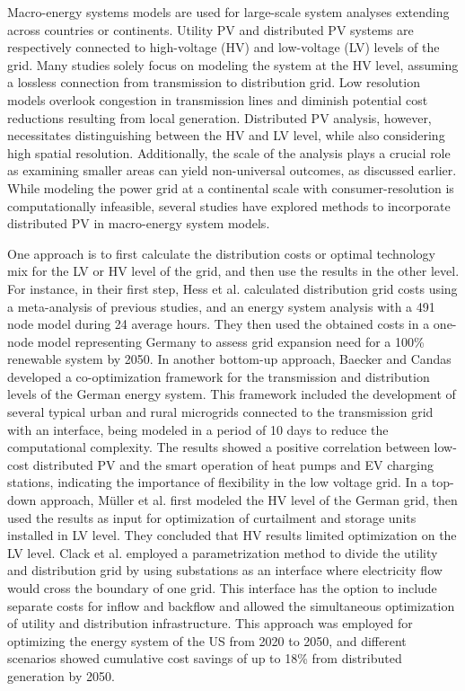 \documentclass[review]{elsarticle}
\begin{document}
	Macro-energy systems models are used for large-scale system analyses extending across countries or continents. Utility PV and distributed PV systems are respectively connected to high-voltage (HV) and low-voltage (LV) levels of the grid. Many studies solely focus on modeling the system at the HV level, assuming a lossless connection from transmission to distribution grid. Low resolution models overlook congestion in transmission lines and diminish potential cost reductions resulting from local generation. Distributed PV analysis, however, necessitates distinguishing between the HV and LV level, while also considering high spatial resolution. Additionally, the scale of the analysis plays a crucial role as examining smaller areas can yield non-universal outcomes, as discussed earlier. While modeling the power grid at a continental scale with consumer-resolution is computationally infeasible, several studies have explored methods to incorporate distributed PV in macro-energy system models.
	
	One approach is to first calculate the distribution costs or optimal technology mix for the LV or HV level of the grid, and then use the results in the other level. For instance, in their first step, Hess et al. \cite{hess_2018}  calculated distribution grid costs using a meta-analysis of previous studies, and an energy system analysis with a 491 node model during 24 average hours. They then used the obtained costs in a one-node model representing Germany to assess grid expansion need for a 100\% renewable system by 2050. In another bottom-up approach, Baecker and Candas  \cite{candas_2022}   developed a co-optimization framework for the transmission and distribution levels of the German energy system. This framework included the development of several typical urban and rural microgrids connected to the transmission grid with an interface, being modeled in a period of 10 days to reduce the computational complexity. The results showed a positive correlation between low-cost distributed PV and the smart operation of heat pumps and EV charging stations, indicating the importance of flexibility in the low voltage grid. In a top-down approach, Müller et al. \cite{muller_2019}  first modeled the HV level of the German grid, then used the results as input for optimization of curtailment and storage units installed in LV level. They concluded that HV results limited optimization on the LV level. Clack et al. \cite{clack_2020}  employed a parametrization method to divide the utility and distribution grid by using substations as an interface where electricity flow would cross the boundary of one grid. This interface has the option to include separate costs for inflow and backflow and allowed the simultaneous optimization of utility and distribution infrastructure. This approach was employed for optimizing the energy system of the US from 2020 to 2050, and different scenarios showed cumulative cost savings of up to 18\% from distributed generation by 2050. 
	
\end{document}
